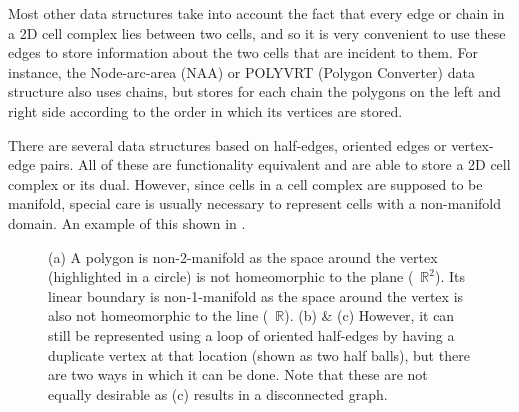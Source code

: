 Most other data structures take into account the fact that every edge or chain in a 2D cell complex lies between two cells, and so it is very convenient to use these edges to store information about the two cells that are incident to them.
For instance, the Node-arc-area (NAA) or POLYVRT (Polygon Converter) data structure \citep{Peucker75} also uses chains, but stores for each chain the polygons on the left and right side according to the order in which its vertices are stored.

There are several data structures based on half-edges, oriented edges or vertex-edge pairs.
All of these are functionality equivalent and are able to store a 2D cell complex or its dual.
However, since cells in a cell complex are supposed to be manifold, special care is usually necessary to represent cells with a non-manifold domain.
An example of this shown in .
\begin{figure}[b]
\centering
{}
\quad
{}
\quad
{}
\caption[Storing non-manifold polygons in a half-edge data structure]{(a) A polygon is non-2-manifold as the space around the vertex (highlighted in a circle) is not homeomorphic to the plane (\ie\ $\mathbb{R}^2$).
Its linear boundary is non-1-manifold as the space around the vertex is also not homeomorphic to the line (\ie\ $\mathbb{R}$).
(b) \& (c) However, it can still be represented using a loop of oriented half-edges by having a duplicate vertex at that location (shown as two half balls), but there are two ways in which it can be done.
Note that these are not equally desirable as (c) results in a disconnected graph.}
\label{fig:nonmanifold-012}
\end{figure}

